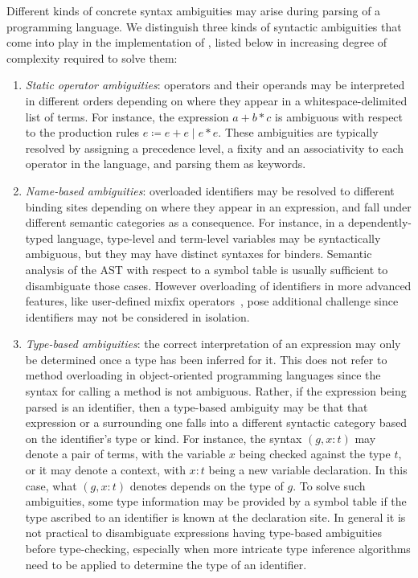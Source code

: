 Different kinds of concrete syntax ambiguities may arise during parsing of a programming language.
We distinguish three kinds of syntactic ambiguities that come into play in the implementation of \Beluga, listed below in increasing degree of complexity required to solve them:
\begin{enumerate}
\item
\textit{Static operator ambiguities}: operators and their operands may be interpreted in different orders depending on where they appear in a whitespace-delimited list of terms.
For instance, the expression $a + b * c$ is ambiguous with respect to the production rules $e\coloneqq e+e\mid e*e$.
These ambiguities are typically resolved by assigning a precedence level, a fixity and an associativity to each operator in the language, and parsing them as keywords.
\item
\textit{Name-based ambiguities}: overloaded identifiers may be resolved to different binding sites depending on where they appear in an expression, and fall under different semantic categories as a consequence.
For instance, in a dependently-typed language, type-level and term-level variables may be syntactically ambiguous, but they may have distinct syntaxes for binders.
Semantic analysis of the \ac{AST} with respect to a symbol table is usually sufficient to disambiguate those cases.
However overloading of identifiers in more advanced features, like user-defined mixfix operators~\cite{danielsson2008parsing}, pose additional challenge since identifiers may not be considered in isolation.
\item
\textit{Type-based ambiguities}: the correct interpretation of an expression may only be determined once a type has been inferred for it.
This does not refer to method overloading in object-oriented programming languages since the syntax for calling a method is not ambiguous.
Rather, if the expression being parsed is an identifier, then a type-based ambiguity may be that that expression or a surrounding one falls into a different syntactic category based on the identifier's type or kind.
For instance, the syntax $ (g, x : t) $ may denote a pair of terms, with the variable $ x $ being checked against the type $ t $, or it may denote a context, with $ x : t $ being a new variable declaration.
In this case, what $ (g, x : t) $ denotes depends on the type of $ g $.
To solve such ambiguities, some type information may be provided by a symbol table if the type ascribed to an identifier is known at the declaration site.
In general it is not practical to disambiguate expressions having type-based ambiguities before type-checking, especially when more intricate type inference algorithms need to be applied to determine the type of an identifier.
\end{enumerate}


